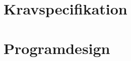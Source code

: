 
\newpage
{}
\setcounter{page}{1}

\setcounter{tocdepth}{2}
\tableofcontents

\section{Kravspecifikation}







\section{Programdesign}







